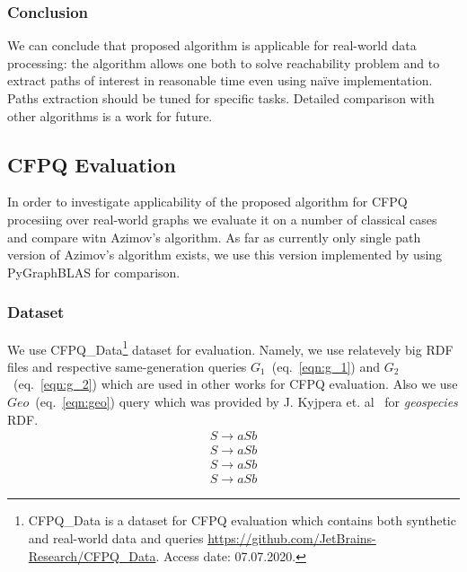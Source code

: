 \subsubsection{Conclusion}

We can conclude that proposed algorithm is applicable for real-world data processing: the algorithm allows one both to solve reachability problem and to extract paths of interest in reasonable time even using na{\"i}ve implementation.
Paths extraction should be tuned for specific tasks.
Detailed comparison with other algorithms is a work for future.

\subsection{CFPQ Evaluation}

In order to investigate applicability of the proposed algorithm for CFPQ procesiing over real-world graphs we evaluate it on a number of classical cases and compare witn Azimov's algorithm.
As far as currently only single path version of Azimov's algorithm exists, we use this version implemented by using PyGraphBLAS for comparison.

\subsubsection{Dataset}

We use CFPQ\_Data\footnote{CFPQ\_Data is a dataset for CFPQ evaluation which contains both synthetic and real-world data and queries \url{https://github.com/JetBrains-Research/CFPQ\_Data}. Access date: 07.07.2020.} dataset for evaluation.
Namely, we use relatevely big RDF files and respective same-generation queries $G_1$~(eq.~\ref{eqn:g_1}) and $G_2$~(eq.~\ref{eqn:g_2}) which are used in other works for CFPQ evaluation. 
Also we use $Geo$~(eq.~\ref{eqn:geo}) query which was provided by J. Kyjpera et. al~\cite{!!!} for \textit{geospecies} RDF.
\begin{align}
\label{eqn:g_1}
S \to a S b
\end{align}
\begin{align}
\label{eqn:g_2}
S \to a S b
\end{align}
\begin{align}
\label{eqn:geo}
S \to a S b
\end{align}
\begin{align}
\label{eqn:ma}
S \to a S b
\end{align}

